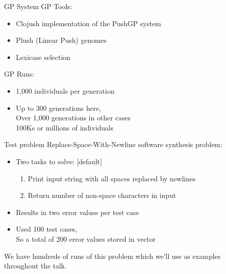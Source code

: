\documentclass{beamer}
\begin{document}
\begin{frame}{GP System}
GP Tools:
\vspace{.5em}
\begin{itemize}
    \setlength\itemsep{.5em}
	\item Clojush implementation of the PushGP system
	\item Plush (Linear Push) genomes~\cite{Helmuth:2016:GPTP}
	\item Lexicase selection~\cite{Helmuth:2014:ieeeTEC}
\end{itemize}
\vspace{1em}
GP Runs:
\begin{itemize}
    \item 1,000 individuals per generation
    \item Up to 300 generations here, 
    	\\ \hspace{.5cm} Over 1,000 generations in other cases
        \\ \hspace{.5cm} 100Ks or millions of individuals
\end{itemize}
\end{frame}

\begin{frame}{Test problem}
Replace-Space-With-Newline software synthesis problem:
\vspace{.5em}
\begin{itemize}
    \setlength\itemsep{.5em}
	\item Two tasks to solve:
    [default]
    \begin{enumerate}
    	\item Print input string with all spaces replaced by newlines
        \item Return number of non-space characters in input
    \end{enumerate}
	\item Results in two error values per test case
	\item Used 100 test cases, \\ \hspace{.25cm} So a total of 200 error values stored in vector
\end{itemize}
\vspace{1em}
We have hundreds of runs of this problem which we'll use as examples throughout the talk.
\end{frame}
\end{document}
